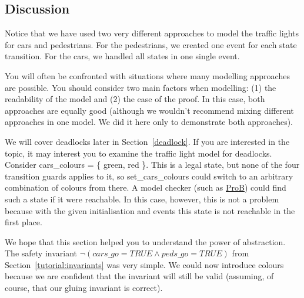 
\subsection{Discussion}
\label{tut_concepts_discussion}

Notice that we have used two very different approaches to model the traffic lights for cars and pedestrians.  For the pedestrians, we created one event for each state transition.  For the cars, we handled all states in one single event.

You will often be confronted with situations where many modelling approaches are possible.  You should consider two main factors when modelling: (1) the readability of the model and (2) the ease of the proof.  In this case, both approaches are equally good (although we wouldn't recommend mixing different approaches in one model. We did it here only to demonstrate both approaches).

We will cover deadlocks later in Section~\ref{deadlock}.  If you are interested in the topic, it may interest you to examine the traffic light model for deadlocks.  Consider \textsf{cars\_colours = \{ green, red \}}. This is a legal state, but none of the four transition guards applies to it, so \textsf{set\_cars\_colours} could switch to an arbitrary combination of colours from there.  A model checker (such as \href{https://prob.hhu.de/}{ProB}) could find such a state if it were reachable.  In this case, however, this is not a problem because with the given initialisation and events this state is not reachable in the first place.

We hope that this section helped you to understand the power of abstraction.  The safety invariant
$\lnot(cars\_go = TRUE \land peds\_go = TRUE)$ from Section~\ref{tutorial:invariants} was very simple.  We could now introduce colours because we are confident that the invariant will still be valid (assuming, of course, that our gluing invariant is correct).

